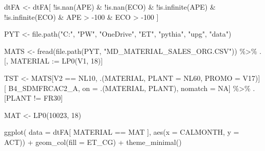 \documentclass[
  american,
  10,
  a4paper,
]{book}
\newenvironment{Shaded}{\begin{snugshade}}{\end{snugshade}}
\newcommand{\AttributeTok}[1]{\textcolor[rgb]{0.40,0.45,0.13}{#1}}
\newcommand{\ConstantTok}[1]{\textcolor[rgb]{0.56,0.35,0.01}{#1}}
\newcommand{\DecValTok}[1]{\textcolor[rgb]{0.68,0.00,0.00}{#1}}
\newcommand{\ErrorTok}[1]{\textcolor[rgb]{0.68,0.00,0.00}{#1}}
\newcommand{\FunctionTok}[1]{\textcolor[rgb]{0.28,0.35,0.67}{#1}}
\newcommand{\NormalTok}[1]{\textcolor[rgb]{0.00,0.23,0.31}{#1}}
\newcommand{\OtherTok}[1]{\textcolor[rgb]{0.00,0.23,0.31}{#1}}
\newcommand{\SpecialCharTok}[1]{\textcolor[rgb]{0.37,0.37,0.37}{#1}}
\newcommand{\StringTok}[1]{\textcolor[rgb]{0.13,0.47,0.30}{#1}}
\theoremstyle{definition}
\theoremstyle{remark}
\begin{document}
\begin{Shaded}
\begin{Highlighting}[]
\NormalTok{dtFA }\OtherTok{\textless{}{-}} 
\NormalTok{  dtFA[}
    \SpecialCharTok{!}\FunctionTok{is.nan}\NormalTok{(APE) }\SpecialCharTok{\&} 
    \SpecialCharTok{!}\FunctionTok{is.nan}\NormalTok{(ECO) }\SpecialCharTok{\&}   
    \SpecialCharTok{!}\FunctionTok{is.infinite}\NormalTok{(APE) }\SpecialCharTok{\&}
    \SpecialCharTok{!}\FunctionTok{is.infinite}\NormalTok{(ECO) }\SpecialCharTok{\&}  
\NormalTok{    APE }\SpecialCharTok{\textgreater{}} \SpecialCharTok{{-}}\DecValTok{100} \SpecialCharTok{\&}
\NormalTok{    ECO }\SpecialCharTok{\textgreater{}} \SpecialCharTok{{-}}\DecValTok{100}\NormalTok{  ]}
\end{Highlighting}
\end{Shaded}

\begin{Shaded}
\begin{Highlighting}[]
\NormalTok{PYT }\OtherTok{\textless{}{-}} \FunctionTok{file.path}\NormalTok{(}\StringTok{"C:"}\NormalTok{, }\StringTok{"PW"}\NormalTok{, }\StringTok{"OneDrive"}\NormalTok{, }\StringTok{"ET"}\NormalTok{, }\StringTok{"pythia"}\NormalTok{, }\StringTok{"upg"}\NormalTok{, }\StringTok{"data"}\NormalTok{)}

\NormalTok{MATS }\OtherTok{\textless{}{-}} 
  \FunctionTok{fread}\NormalTok{(}\FunctionTok{file.path}\NormalTok{(PYT, }\StringTok{"MD\_MATERIAL\_SALES\_ORG.CSV"}\NormalTok{)) }\SpecialCharTok{\%\textgreater{}\%}
\NormalTok{  .[, MATERIAL }\SpecialCharTok{:}\ErrorTok{=} \FunctionTok{LP0}\NormalTok{(V1, }\DecValTok{18}\NormalTok{)] }

\NormalTok{TST }\OtherTok{\textless{}{-}} 
\NormalTok{  MATS[V2 }\SpecialCharTok{==} \StringTok{\textquotesingle{}NL10\textquotesingle{}}\NormalTok{, .(MATERIAL, }\AttributeTok{PLANT =} \StringTok{\textquotesingle{}NL60\textquotesingle{}}\NormalTok{, }\AttributeTok{PROMO =}\NormalTok{ V17)][}
\NormalTok{    B4\_SDMFRCAC2\_A, on }\OtherTok{=}\NormalTok{ .(MATERIAL, PLANT), nomatch }\OtherTok{=} \ConstantTok{NA}\NormalTok{] }\SpecialCharTok{\%\textgreater{}\%}
\NormalTok{  .[PLANT }\SpecialCharTok{!=} \StringTok{\textquotesingle{}FR30\textquotesingle{}}\NormalTok{]}
\end{Highlighting}
\end{Shaded}

\begin{Shaded}
\begin{Highlighting}[]
\NormalTok{MAT }\OtherTok{\textless{}{-}} \FunctionTok{LP0}\NormalTok{(}\StringTok{\textquotesingle{}10023\textquotesingle{}}\NormalTok{, }\DecValTok{18}\NormalTok{)}

\FunctionTok{ggplot}\NormalTok{(}
  \AttributeTok{data =}\NormalTok{ dtFA[}
\NormalTok{    MATERIAL }\SpecialCharTok{==}\NormalTok{ MAT}
\NormalTok{    ], }\FunctionTok{aes}\NormalTok{(}\AttributeTok{x =}\NormalTok{ CALMONTH, }\AttributeTok{y =}\NormalTok{ ACT)) }\SpecialCharTok{+}
  \FunctionTok{geom\_col}\NormalTok{(}\AttributeTok{fill =}\NormalTok{ ET\_CG) }\SpecialCharTok{+}
  \FunctionTok{theme\_minimal}\NormalTok{()}
\end{Highlighting}
\end{Shaded}
\end{document}

